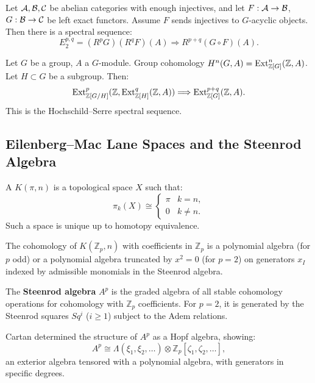 \begin{theorem}
Let $\mathcal{A}, \mathcal{B}, \mathcal{C}$ be abelian categories with enough injectives, and let $F: \mathcal{A} \to \mathcal{B}$, $G: \mathcal{B} \to \mathcal{C}$ be left exact functors. Assume $F$ sends injectives to $G$-acyclic objects. Then there is a spectral sequence:
\[
E_2^{p,q} = (R^p G)(R^q F)(A) \Longrightarrow R^{p+q}(G \circ F)(A).
\]
\end{theorem}

\begin{example}
Let $G$ be a group, $A$ a $G$-module. Group cohomology $H^n(G, A) = \operatorname{Ext}^n_{\mathbb{Z}[G]}(\mathbb{Z}, A)$. Let $H \subset G$ be a subgroup. Then:
\[
\operatorname{Ext}^p_{\mathbb{Z}[G/H]}(\mathbb{Z}, \operatorname{Ext}^q_{\mathbb{Z}[H]}(\mathbb{Z}, A)) \Longrightarrow \operatorname{Ext}^{p+q}_{\mathbb{Z}[G]}(\mathbb{Z}, A).
\]
This is the Hochschild--Serre spectral sequence.
\end{example}

\subsection{Eilenberg--Mac Lane Spaces and the Steenrod Algebra}

\begin{definition}
A $K(\pi, n)$ is a topological space $X$ such that:
\[
\pi_k(X) \cong \begin{cases} \pi & k = n, \\ 0 & k \neq n. \end{cases}
\]
Such a space is unique up to homotopy equivalence.
\end{definition}

\begin{theorem}
The cohomology of $K(\mathbb{Z}_p, n)$ with coefficients in $\mathbb{Z}_p$ is a polynomial algebra (for $p$ odd) or a polynomial algebra truncated by $x^2 = 0$ (for $p = 2$) on generators $x_I$ indexed by admissible monomials in the Steenrod algebra.
\end{theorem}

The \textbf{Steenrod algebra} $A^p$ is the graded algebra of all stable cohomology operations for cohomology with $\mathbb{Z}_p$ coefficients. For $p=2$, it is generated by the Steenrod squares $Sq^i$ ($i \geq 1$) subject to the Adem relations.

Cartan determined the structure of $A^p$ as a Hopf algebra, showing:
\[
A^p \cong \Lambda(\xi_1, \xi_2, \dots) \otimes \mathbb{Z}_p[\zeta_1, \zeta_2, \dots],
\]
an exterior algebra tensored with a polynomial algebra, with generators in specific degrees.

